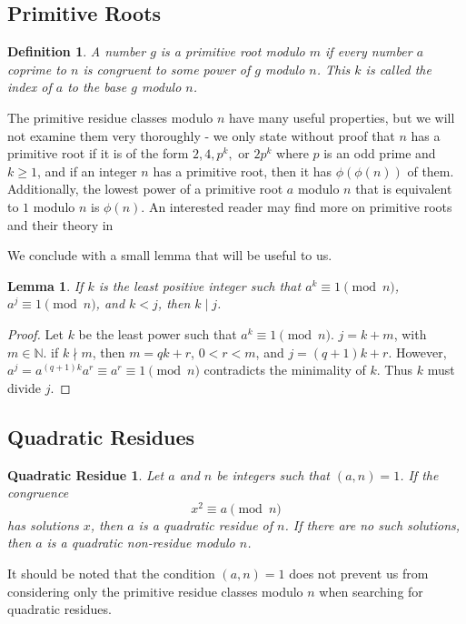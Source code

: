 \documentclass{article}
\newtheorem*{lemma}{Lemma}
\newtheorem*{definition}{Definition}
\begin{document}
\subsection*{Primitive Roots}
\begin{definition}
A number $g$ is a \textit{primitive root} modulo $m$ if every number $a$ coprime to $n$ is congruent to some power of $g$ modulo $n$. This $k$ is called the index of $a$ to the base $g$ modulo $n$.
\end{definition}
\par The primitive residue classes modulo $n$ have many useful properties, but we will not examine them very thoroughly - we only state without proof that $n$ has a primitive root if it is of the form $2, 4, p^k, \text{ or } 2p^k$ where $p$ is an odd prime and $k \geq 1$, and if an integer $n$ has a primitive root, then it has $\phi(\phi(n))$ of them. Additionally, the lowest power of a primitive root $a$ modulo $n$ that is equivalent to $1$ modulo $n$ is $\phi(n)$. An interested reader may find more on primitive roots and their theory in \citep[Appendix 2]{riesel}

We conclude with a small lemma that will be useful to us.
\begin{lemma}
If $k$ is the least positive integer such that $a^k \equiv 1 \pmod n$, $a^j \equiv 1 \pmod n$, and $k < j$, then $k \mid j$.
\end{lemma}
\begin{proof}
Let $k$ be the least power such that $a^k \equiv 1 \pmod n$. $j = k + m$, with $m \in \mathbb N$. if $k \nmid m$, then $m = qk+ r$, $ 0 < r < m$, and $j = (q+1)k + r$. However, $a^j = a^{(q+1)k}a^r \equiv a^r \equiv 1 \pmod n$ contradicts the minimality of $k$. Thus $k$ must divide $j$.
\end{proof}

\subsection*{Quadratic Residues}
\newtheorem*{quadraticresiduedefinition}{Quadratic Residue}
\begin{quadraticresiduedefinition}
Let $a$ and $n$ be integers such that $(a,n) = 1$. If the congruence
	$$x^2 \equiv a \pmod n$$
has solutions $x$, then $a$ is a \textit{quadratic residue} of $n$. If there are no such solutions, then $a$ is a \textit{quadratic non-residue} modulo $n$.
\end{quadraticresiduedefinition}

\par It should be noted that the condition $(a,n) = 1$ does not prevent us from considering only the primitive residue classes modulo $n$ when searching for quadratic residues. 
\end{document}
